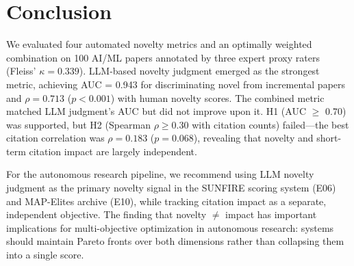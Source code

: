 \documentclass[11pt,a4paper]{article}
\begin{document}
\section{Conclusion}
\label{sec:conclusion}

We evaluated four automated novelty metrics and an optimally weighted
combination on 100 AI/ML papers annotated by three expert proxy raters
(Fleiss' $\kappa = 0.339$).  LLM-based novelty judgment emerged as the
strongest metric, achieving AUC = 0.943 for discriminating novel from
incremental papers and $\rho = 0.713$ ($p < 0.001$) with human novelty
scores.  The combined metric matched LLM judgment's AUC but did not
improve upon it.  H1 (AUC $\geq$ 0.70) was supported, but H2 (Spearman
$\rho \geq 0.30$ with citation counts) failed---the best citation
correlation was $\rho = 0.183$ ($p = 0.068$), revealing that novelty and
short-term citation impact are largely independent.

For the autonomous research pipeline, we recommend using LLM novelty
judgment as the primary novelty signal in the SUNFIRE scoring system
(E06) and MAP-Elites archive (E10), while tracking citation impact as a
separate, independent objective.  The finding that novelty $\neq$ impact
has important implications for multi-objective optimization in
autonomous research: systems should maintain Pareto fronts over both
dimensions rather than collapsing them into a single score.


\end{document}
